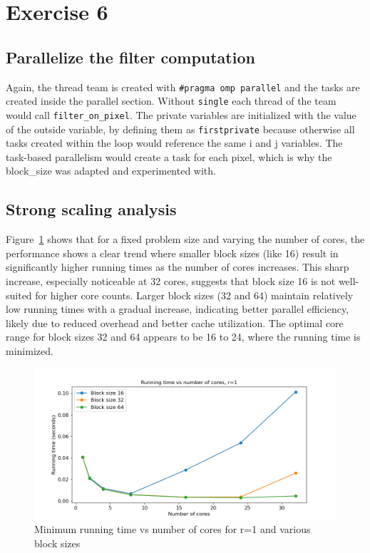 \documentclass[a4paper,%
7pt,%
DIV12,
headsepline,%
headings=normal,
]{scrartcl}
\begin{document}

\section{Exercise 6}

\subsection{Parallelize the filter computation}

Again, the thread team is created with \texttt{\#pragma omp parallel} and the tasks are created inside the parallel section. Without \texttt{single} each thread of the team would call \texttt{filter\_on\_pixel}. 
The private variables are initialized with the value of the outside variable, by defining them as \texttt{firstprivate} because otherwise all tasks created within the loop would reference the same i and j variables. The task-based parallelism would create a task for each pixel, which is why the block\_size was adapted and experimented with.

\subsection{Strong scaling analysis}

Figure~\ref{fig:strong_scaling_plot} shows that for a fixed problem size and varying the number of cores, the performance shows a clear trend where smaller block sizes (like 16) result in significantly higher running times as the number of cores increases. This sharp increase, especially noticeable at 32 cores, suggests that block size 16 is not well-suited for higher core counts. Larger block sizes (32 and 64) maintain relatively low running times with a gradual increase, indicating better parallel efficiency, likely due to reduced overhead and better cache utilization.  The optimal core range for block sizes 32 and 64 appears to be 16 to 24, where the running time is minimized.

\begin{figure}[htbp]
    \centering
    \includegraphics[width=1\linewidth]{./strong_scaling_plot.png}
    \caption{Minimum running time vs number of cores for r=1 and various block sizes}
    \label{fig:strong_scaling_plot}
\end{figure}
\end{document}
